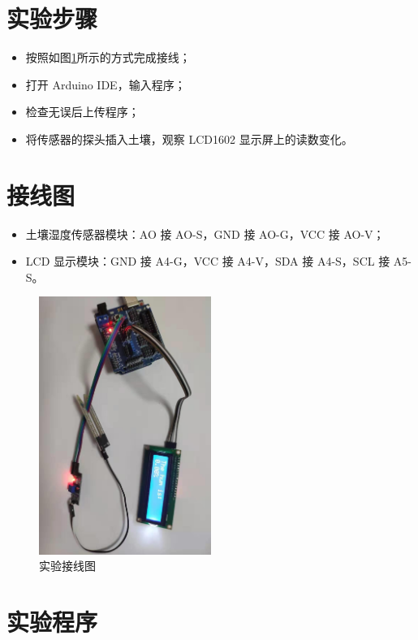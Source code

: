 \documentclass[UTF8, oneside]{ctexbook}
\begin{document}
\section{实验步骤}
\begin{itemize}
    \item[(1)] 按照如图\ref{s17_line}所示的方式完成接线；
    \item[(2)] 打开 Arduino IDE，输入程序；
    \item[(3)] 检查无误后上传程序；
    \item[(4)] 将传感器的探头插入土壤，观察 LCD1602 显示屏上的读数变化。
\end{itemize}

\section{接线图}
\begin{itemize}
    \item 土壤湿度传感器模块：AO 接 AO-S，GND 接 AO-G，VCC 接 AO-V；
    \item LCD 显示模块：GND 接 A4-G，VCC 接 A4-V，SDA 接 A4-S，SCL 接 A5-S。
\end{itemize}
\begin{figure}[h]
    \centering
    \includegraphics[width=0.5\textwidth]{./result/sensor/17/lines2.png}
    \caption{实验接线图}
    \label{s17_line}
\end{figure}

\newpage
\section{实验程序}

\end{document}
